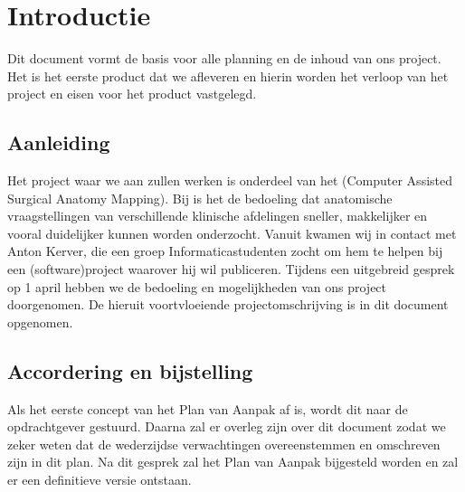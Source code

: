 \section{Introductie}


Dit document vormt de basis voor alle planning en de inhoud van ons project.
Het is het eerste product dat we afleveren en hierin worden het verloop van het project en eisen voor het product vastgelegd.

\subsection{Aanleiding}


Het project waar we aan zullen werken is onderdeel van het \casamproject (Computer Assisted Surgical Anatomy Mapping). 
Bij \casam is het de bedoeling dat anatomische vraagstellingen van verschillende klinische afdelingen sneller, makkelijker en vooral duidelijker kunnen worden onderzocht.
Vanuit \casam kwamen wij in contact met Anton Kerver, die een groep Informaticastudenten zocht om hem te helpen bij een (software)project waarover hij wil publiceren.
Tijdens een uitgebreid gesprek op 1 april hebben we de bedoeling en mogelijkheden van ons project doorgenomen.
De hieruit voortvloeiende projectomschrijving is in dit document opgenomen.

\subsection{Accordering en bijstelling}


Als het eerste concept van het Plan van Aanpak af is, wordt dit naar de opdrachtgever gestuurd.
Daarna zal er overleg zijn over dit document zodat we zeker weten dat de wederzijdse verwachtingen overeenstemmen en omschreven zijn in dit plan.
Na dit gesprek zal het Plan van Aanpak bijgesteld worden en zal er een definitieve versie ontstaan.

